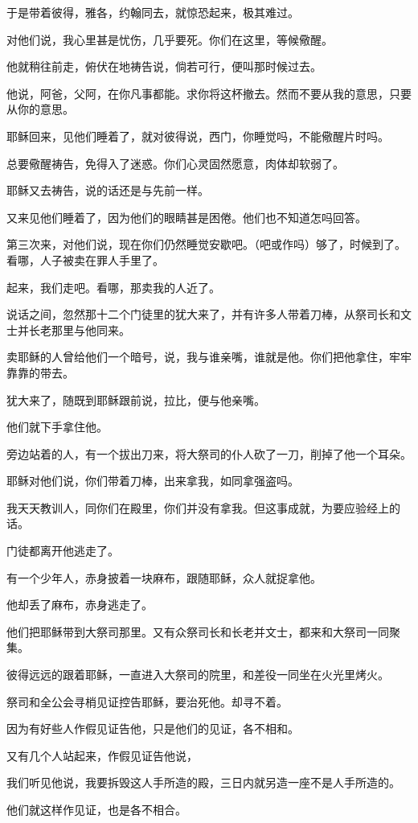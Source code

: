 \documentclass[12pt,oneside]{book}
\begin{document}
于是带着彼得，雅各，约翰同去，就惊恐起来，极其难过。

对他们说，我心里甚是忧伤，几乎要死。你们在这里，等候儆醒。

他就稍往前走，俯伏在地祷告说，倘若可行，便叫那时候过去。

他说，阿爸，父阿，在你凡事都能。求你将这杯撤去。然而不要从我的意思，只要从你的意思。

耶稣回来，见他们睡着了，就对彼得说，西门，你睡觉吗，不能儆醒片时吗。

总要儆醒祷告，免得入了迷惑。你们心灵固然愿意，肉体却软弱了。

耶稣又去祷告，说的话还是与先前一样。

又来见他们睡着了，因为他们的眼睛甚是困倦。他们也不知道怎吗回答。

第三次来，对他们说，现在你们仍然睡觉安歇吧。（吧或作吗）够了，时候到了。看哪，人子被卖在罪人手里了。

起来，我们走吧。看哪，那卖我的人近了。

说话之间，忽然那十二个门徒里的犹大来了，并有许多人带着刀棒，从祭司长和文士并长老那里与他同来。

卖耶稣的人曾给他们一个暗号，说，我与谁亲嘴，谁就是他。你们把他拿住，牢牢靠靠的带去。

犹大来了，随既到耶稣跟前说，拉比，便与他亲嘴。

他们就下手拿住他。

旁边站着的人，有一个拔出刀来，将大祭司的仆人砍了一刀，削掉了他一个耳朵。

耶稣对他们说，你们带着刀棒，出来拿我，如同拿强盗吗。

我天天教训人，同你们在殿里，你们并没有拿我。但这事成就，为要应验经上的话。

门徒都离开他逃走了。

有一个少年人，赤身披着一块麻布，跟随耶稣，众人就捉拿他。

他却丢了麻布，赤身逃走了。

他们把耶稣带到大祭司那里。又有众祭司长和长老并文士，都来和大祭司一同聚集。

彼得远远的跟着耶稣，一直进入大祭司的院里，和差役一同坐在火光里烤火。

祭司和全公会寻梢见证控告耶稣，要治死他。却寻不着。

因为有好些人作假见证告他，只是他们的见证，各不相和。

又有几个人站起来，作假见证告他说，

我们听见他说，我要拆毁这人手所造的殿，三日内就另造一座不是人手所造的。

他们就这样作见证，也是各不相合。
\end{document}
